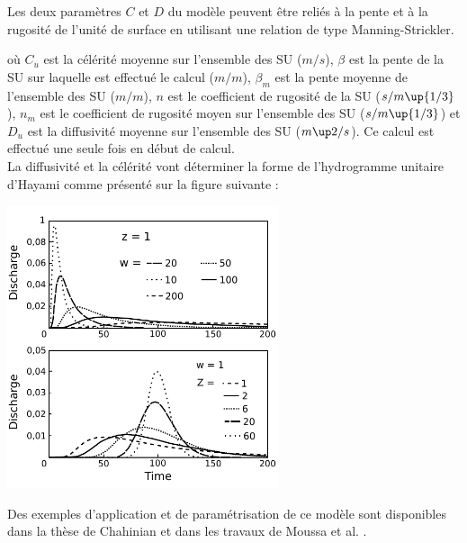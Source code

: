 Les deux paramètres $C$ et $D$ du modèle peuvent être reliés à la pente et à la rugosité de l'unité de surface en utilisant une relation de type Manning-Strickler.



où $C_u$ est la célérité moyenne sur l'ensemble des SU ($m/s$), $\beta$ est la pente de la SU sur laquelle est effectué le calcul ($m/m$),  $\beta_m$ est la pente moyenne de l'ensemble des SU ($m/m$), $n$ est le coefficient de rugosité de la SU ($s/m\up{1/3}$), $n_m$ est le coefficient de rugosité moyen sur l'ensemble des SU ($s/m\up{1/3}$) et $D_u$ est la diffusivité moyenne sur l'ensemble des SU ($m\up2/s$). Ce calcul est effectué une seule fois en début de calcul.\\

La diffusivité et la célérité vont déterminer la forme de l'hydrogramme unitaire d'Hayami comme présenté sur la figure suivante :


\includegraphics[width=8cm]{doc/common/Graphique_noyau_Hayami.pdf}

Des exemples d'application et de paramétrisation de ce modèle sont disponibles dans la thèse de Chahinian \cite{Chahinian2004} et dans les travaux de Moussa et al. \cite{Moussa2002}.\\
